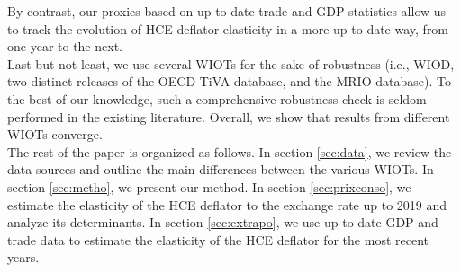 \documentclass[11pt,a4paper]{paper} %
\begin{document}
By contrast, our proxies based on up-to-date trade and GDP statistics allow us to track the evolution of HCE deflator elasticity in a more up-to-date way, from one year to the next. \\
Last but not least, we use several WIOTs for the sake of robustness (i.e., WIOD, two distinct releases of the OECD TiVA database, and the MRIO database). 
To the best of our knowledge, such a comprehensive robustness check is seldom performed in the existing literature.
Overall, we show that results from different WIOTs converge. \\
The rest of the paper is organized as follows.
In section \ref{sec:data}, we review the data sources and outline the main differences between the various WIOTs.
In section \ref{sec:metho}, we present our method.
In section \ref{sec:prixconso}, we estimate the elasticity of the HCE deflator to the exchange rate up to 2019 and analyze its determinants.
In section \ref{sec:extrapo}, we use up-to-date GDP and trade data to estimate the elasticity of the HCE deflator for the most recent years.


\end{document}
